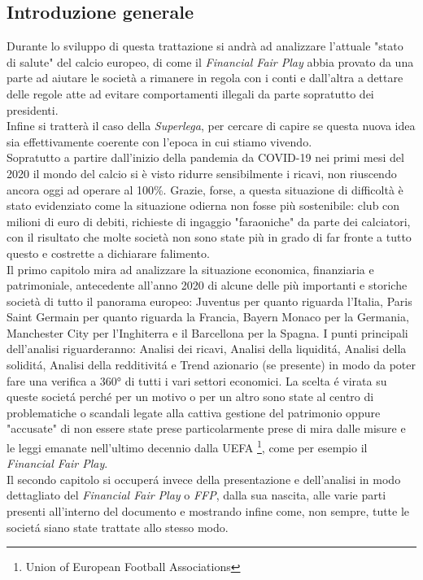 \documentclass[
    corpo=11.5pt,
    oneside,
    evenboxes,
    tipotesi=triennale,
    stile=classica,
    oldstyle,
    autoretitolo,
    greek,
]{toptesi}
\begin{document}
\begin{interlinea}{1.5}
\chapter{Introduzione generale}
Durante lo sviluppo di questa trattazione si andrà ad analizzare l'attuale "stato di salute"
del calcio europeo, di come il \emph{Financial Fair Play} abbia provato da una parte ad aiutare le società a rimanere in regola con i conti e 
dall'altra a dettare delle regole atte ad evitare comportamenti illegali da parte sopratutto dei presidenti.\\
Infine si tratterà il caso della \emph{Superlega}, per cercare di capire se questa nuova idea sia effettivamente coerente con l'epoca in cui stiamo vivendo.\\
Sopratutto a partire dall'inizio della pandemia da COVID-19 nei primi mesi del 2020 il mondo del calcio si è visto ridurre sensibilmente i ricavi, non riuscendo 
ancora oggi ad operare al 100\%. Grazie, forse, a questa situazione di difficoltà è stato evidenziato come la situazione odierna non fosse più sostenibile: 
club con milioni di euro di debiti, richieste di ingaggio "faraoniche" da parte dei calciatori, con il risultato che molte societ\`a non sono state pi\`u in grado di far fronte 
a tutto questo e costrette a dichiarare falimento.\\
Il primo capitolo mira ad analizzare la situazione economica, finanziaria e patrimoniale, antecedente all'anno 2020 di alcune delle più 
importanti e storiche societ\`a di tutto il panorama europeo: Juventus per quanto riguarda l'Italia, Paris Saint Germain per quanto riguarda la 
Francia, Bayern Monaco per la Germania, Manchester City per l'Inghiterra e il Barcellona per la Spagna. I punti principali dell'analisi riguarderanno: 
Analisi dei ricavi, Analisi della liquidit\'a, Analisi della solidit\'a, Analisi della redditivit\'a e Trend azionario (se presente) in modo da 
poter fare una verifica a 360° di tutti i vari settori economici. La scelta \'e virata su queste societ\'a perch\'e per un motivo o per un altro sono state 
al centro di problematiche o scandali legate alla cattiva gestione del patrimonio oppure "accusate" di non essere state prese particolarmente prese di mira dalle misure e le leggi 
emanate nell'ultimo decennio dalla UEFA \footnote{ Union of European Football Associations}, come per esempio il \emph{Financial Fair Play}.\\
Il secondo capitolo si occuper\'a invece della presentazione e dell'analisi in modo dettagliato del \emph{Financial Fair Play} o 
\emph{FFP}, dalla sua nascita, alle varie parti presenti all'interno del documento e mostrando infine come, non sempre, tutte le societ\'a siano state trattate allo stesso modo.\\

\end{interlinea}
\end{document}
